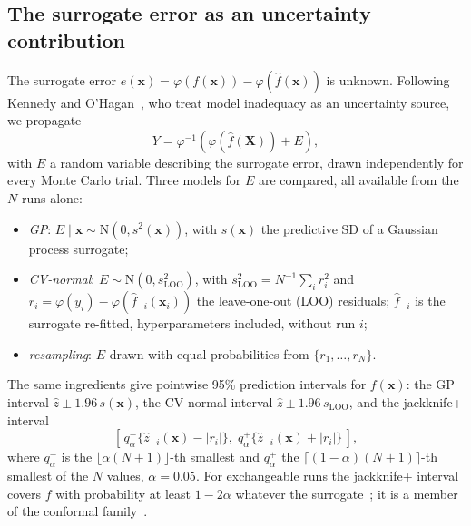 \subsection{The surrogate error as an uncertainty contribution}
\label{sec:contrib}
The surrogate error $e(\mathbf x)=\varphi(f(\mathbf x))-\varphi(\hat f(\mathbf x))$
is unknown. Following Kennedy and O'Hagan~\cite{kennedy2001}, who treat model
inadequacy as an uncertainty source, we propagate
\begin{equation}
Y=\varphi^{-1}\!\left(\varphi(\hat f(\mathbf X))+E\right),
\label{eq:contrib}
\end{equation}
with $E$ a random variable describing the surrogate error, drawn
independently for every Monte Carlo trial. Three models for $E$ are
compared, all available from the $N$ runs alone:
\begin{itemize}\setlength\itemsep{1pt}
\item \emph{GP}: $E\mid\mathbf x\sim\mathrm N(0,s^2(\mathbf x))$, with
$s(\mathbf x)$ the predictive SD of a Gaussian process surrogate;
\item \emph{CV-normal}: $E\sim\mathrm N(0,s_{\mathrm{LOO}}^2)$, with
$s_{\mathrm{LOO}}^2=N^{-1}\sum_i r_i^2$ and
$r_i=\varphi(y_i)-\varphi(\hat f_{-i}(\mathbf x_i))$ the leave-one-out (LOO)
residuals; $\hat f_{-i}$ is the surrogate re-fitted, hyperparameters
included, without run $i$;
\item \emph{resampling}: $E$ drawn with equal probabilities from
$\{r_1,\dots,r_N\}$.
\end{itemize}
The same ingredients give pointwise 95\% prediction intervals for
$f(\mathbf x)$: the GP interval $\hat z\pm1.96\,s(\mathbf x)$, the CV-normal
interval $\hat z\pm1.96\,s_{\mathrm{LOO}}$, and the jackknife+
interval~\cite{barber2021}
\begin{equation}
\left[\,q^-_{\alpha}\{\hat z_{-i}(\mathbf x)-|r_i|\},\;
q^+_{\alpha}\{\hat z_{-i}(\mathbf x)+|r_i|\}\,\right],
\end{equation}
where $q^-_\alpha$ is the $\lfloor\alpha(N+1)\rfloor$-th smallest and
$q^+_\alpha$ the $\lceil(1-\alpha)(N+1)\rceil$-th smallest of the $N$ values,
$\alpha=0.05$. For exchangeable runs the jackknife+ interval covers $f$ with
probability at least $1-2\alpha$ whatever the surrogate~\cite{barber2021};
it is a member of the conformal family~\cite{angelopoulos2023}.

